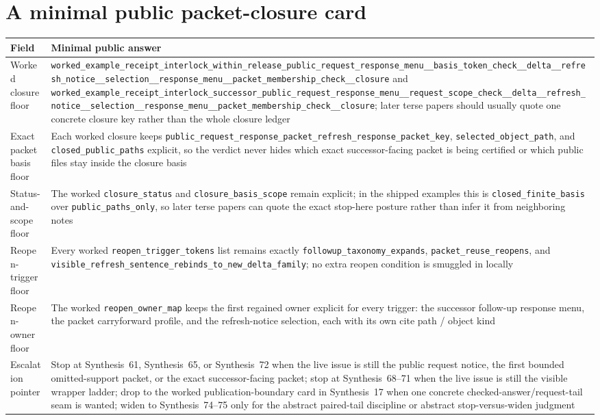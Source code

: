 \documentclass[11pt]{article}
\begin{document}
\section{A minimal public packet-closure card}
\begin{table}[t]
\centering
\small
\begin{tabularx}{\linewidth}{@{}lX@{}}
\toprule
Field & Minimal public answer \\
\midrule
Worked closure floor & \nolinkurl{worked_example_receipt_interlock_within_release_public_request_response_menu__basis_token_check__delta__refresh_notice__selection__response_menu__packet_membership_check__closure} and \nolinkurl{worked_example_receipt_interlock_successor_public_request_response_menu__request_scope_check__delta__refresh_notice__selection__response_menu__packet_membership_check__closure}; later terse papers should usually quote one concrete closure key rather than the whole closure ledger \\
Exact packet basis floor & Each worked closure keeps \nolinkurl{public_request_response_packet_refresh_response_packet_key}, \nolinkurl{selected_object_path}, and \nolinkurl{closed_public_paths} explicit, so the verdict never hides which exact successor-facing packet is being certified or which public files stay inside the closure basis \\
Status-and-scope floor & The worked \nolinkurl{closure_status} and \nolinkurl{closure_basis_scope} remain explicit; in the shipped examples this is \nolinkurl{closed_finite_basis} over \nolinkurl{public_paths_only}, so later terse papers can quote the exact stop-here posture rather than infer it from neighboring notes \\
Reopen-trigger floor & Every worked \nolinkurl{reopen_trigger_tokens} list remains exactly \nolinkurl{followup_taxonomy_expands}, \nolinkurl{packet_reuse_reopens}, and \nolinkurl{visible_refresh_sentence_rebinds_to_new_delta_family}; no extra reopen condition is smuggled in locally \\
Reopen-owner floor & The worked \nolinkurl{reopen_owner_map} keeps the first regained owner explicit for every trigger: the successor follow-up response menu, the packet carryforward profile, and the refresh-notice selection, each with its own cite path / object kind \\
Escalation pointer & Stop at Synthesis~61, Synthesis~65, or Synthesis~72 when the live issue is still the public request notice, the first bounded omitted-support packet, or the exact successor-facing packet; stop at Synthesis~68--71 when the live issue is still the visible wrapper ladder; drop to the worked publication-boundary card in Synthesis~17 when one concrete checked-answer/request-tail seam is wanted; widen to Synthesis~74--75 only for the abstract paired-tail discipline or abstract stop-versus-widen judgment \\

\end{tabularx}
\end{table}
\end{document}

